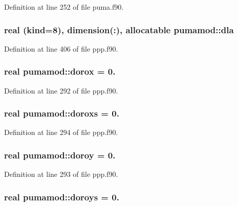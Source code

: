 \-Definition at line 252 of file puma.\-f90.

\hypertarget{classpumamod_af689f39b83711b2d5c805279eb5391c1}{
\subsubsection[{dla}]{\setlength{\rightskip}{0pt plus 5cm}real (kind=8), dimension(\-:), allocatable {\bf pumamod\-::dla}}}
\label{classpumamod_af689f39b83711b2d5c805279eb5391c1}


\-Definition at line 406 of file ppp.\-f90.

\hypertarget{classpumamod_aabd49cfc66d47dea3cf55589fc8ddabc}{
\subsubsection[{dorox}]{\setlength{\rightskip}{0pt plus 5cm}real {\bf pumamod\-::dorox} = 0.}}
\label{classpumamod_aabd49cfc66d47dea3cf55589fc8ddabc}


\-Definition at line 292 of file ppp.\-f90.

\hypertarget{classpumamod_a848fc48f89796c7e1bfb0b1a6d2edb50}{
\subsubsection[{doroxs}]{\setlength{\rightskip}{0pt plus 5cm}real {\bf pumamod\-::doroxs} = 0.}}
\label{classpumamod_a848fc48f89796c7e1bfb0b1a6d2edb50}


\-Definition at line 294 of file ppp.\-f90.

\hypertarget{classpumamod_a2775f20201557322bc0de9c6967cc476}{
\subsubsection[{doroy}]{\setlength{\rightskip}{0pt plus 5cm}real {\bf pumamod\-::doroy} = 0.}}
\label{classpumamod_a2775f20201557322bc0de9c6967cc476}


\-Definition at line 293 of file ppp.\-f90.

\hypertarget{classpumamod_ad8bf2c0adad70f111c86eb8924c1c52c}{
\subsubsection[{doroys}]{\setlength{\rightskip}{0pt plus 5cm}real {\bf pumamod\-::doroys} = 0.}}
\label{classpumamod_ad8bf2c0adad70f111c86eb8924c1c52c}


